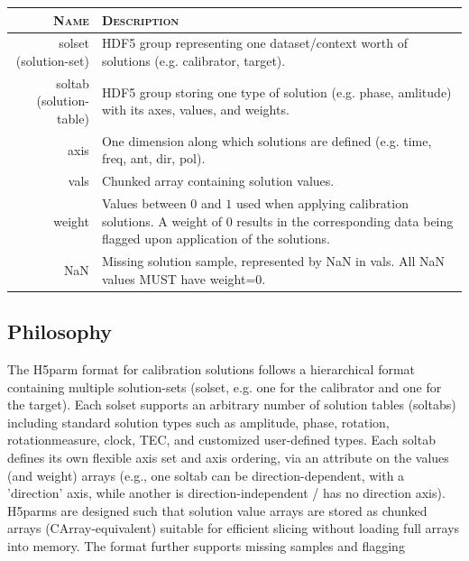 \documentclass[a4paper,10pt,bibtotoc]{scrartcl}
\begin{document}
\begin{center}
  \begin{tabular}{rp{11cm}}
    \textsc{Name} & \textsc{Description} \\
    \hline
    solset (solution-set) & HDF5 group representing one dataset/context worth of solutions (e.g. calibrator, target).  \\
    soltab (solution-table) & HDF5 group storing one type of solution (e.g. phase, amlitude) with its axes, values, and weights.  \\
    axis & One dimension along which solutions are defined (e.g. time, freq, ant, dir, pol). \\
    vals & Chunked array containing solution values. \\
    weight & Values between $0$ and $1$ used when applying calibration solutions. A weight of $0$ results in the corresponding data being flagged upon application of the solutions.\\
    NaN & Missing solution sample, represented by NaN in vals. All NaN values MUST have weight=0. \\
    \hline
  \end{tabular}
\end{center}

\subsection{Philosophy}
The H5parm format for calibration solutions follows a hierarchical format containing multiple solution-sets (solset, e.g. one for the calibrator and one for the target). Each solset supports an arbitrary number of solution tables (soltabs) including standard solution types such as amplitude, phase, rotation, rotationmeasure, clock, TEC, and customized user-defined types. 
Each soltab defines its own flexible axis set and axis ordering, via an attribute on the values (and weight) arrays (e.g., one soltab can be direction-dependent, with a 'direction' axis, while another is direction-independent / has no direction axis). 
H5parms are designed such that solution value arrays are stored as chunked arrays (CArray-equivalent) suitable for
efficient slicing without loading full arrays into memory. 
The format further supports missing samples and flagging
\end{document}
